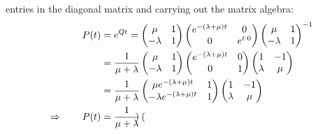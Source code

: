 \documentclass[12pt]{article}
\theoremstyle{plain}
\theoremstyle{definition}
\theoremstyle{remark}
\begin{document}
\begin{enumerate}
\begin{enumerate}
      entries in the diagonal matrix and carrying out the matrix
      algebra:
      \begin{align}
        P(t) &= e^{Qt} =
          \begin{pmatrix}
            \mu & 1 \\
            -\lambda & 1 \\
          \end{pmatrix}
          \begin{pmatrix}
            e^{-(\lambda+\mu)t} & 0 \\
            0 & e^{t \cdot 0} \\
          \end{pmatrix}
          \begin{pmatrix}
            \mu & 1 \\
            -\lambda & 1 \\
          \end{pmatrix}^{-1} \label{q2a.1}\\
        &=
          \frac{1}{\mu+\lambda}
          \begin{pmatrix}
            \mu & 1 \\
            -\lambda & 1 \\
          \end{pmatrix}
          \begin{pmatrix}
            e^{-(\lambda+\mu)t} & 0 \\
            0 & 1 \\
          \end{pmatrix}
          \begin{pmatrix}
            1 & -1 \\
            \lambda & \mu
          \end{pmatrix}
          \notag \\
        &=
          \frac{1}{\mu+\lambda}
          \begin{pmatrix}
            \mu e^{-(\lambda+\mu)t} & 1 \\
            -\lambda e^{-(\lambda+\mu)t}& 1 \\
          \end{pmatrix}
          \begin{pmatrix}
            1 & -1 \\
            \lambda & \mu
          \end{pmatrix}
          \notag \\
      \Rightarrow \qquad
      P(t)
        &=
          \frac{1}{\mu+\lambda}
          \begin{pmatrix}

\end{pmatrix}
\end{align}
\end{enumerate}
\end{enumerate}
\end{document}
